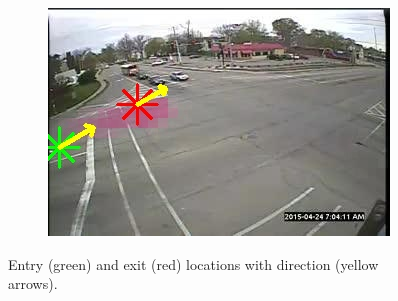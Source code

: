 \begin{figure}[!h]
\begin{subfigure}{0.32\linewidth}
        \end{subfigure}
        \begin{subfigure}{0.32\linewidth}
            \includegraphics[width=\linewidth]{./img/scene_learning/res/230955/230955-5.jpg}
        \end{subfigure}
        \caption{Entry (green) and exit (red) locations with direction (yellow arrows).}
        \label{fig:entry-exit-full-2}
\end{figure}
